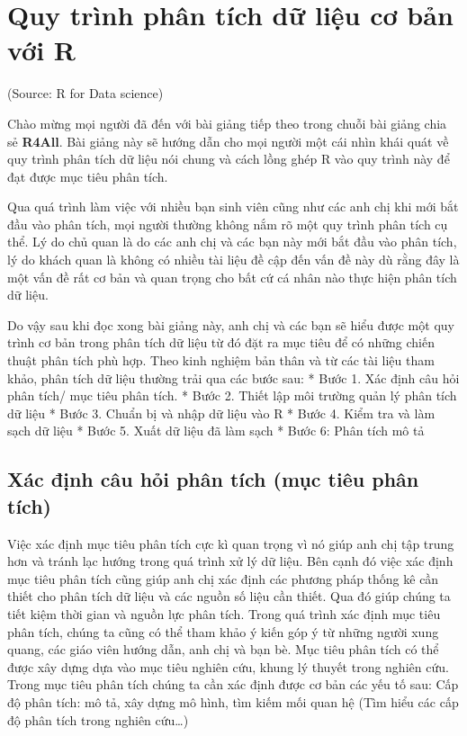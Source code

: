 \documentclass[
]{book}
\theoremstyle{definition}
\theoremstyle{definition}
\theoremstyle{definition}
\theoremstyle{definition}
\theoremstyle{remark}
\begin{document}
\hypertarget{quy-truxecnh-phuxe2n-tuxedch-dux1eef-liux1ec7u-cux1a1-bux1ea3n-vux1edbi-r}{%
\chapter{Quy trình phân tích dữ liệu cơ bản với R}\label{quy-truxecnh-phuxe2n-tuxedch-dux1eef-liux1ec7u-cux1a1-bux1ea3n-vux1edbi-r}}

(Source: R for Data science)

Chào mừng mọi người đã đến với bài giảng tiếp theo trong chuỗi bài giảng chia sẻ \textbf{R4All}. Bài giảng này sẽ hướng dẫn cho mọi người một cái nhìn khái quát về quy trình phân tích dữ liệu nói chung và cách lồng ghép R vào quy trình này để đạt được mục tiêu phân tích.

Qua quá trình làm việc với nhiều bạn sinh viên cũng như các anh chị khi mới bắt đầu vào phân tích, mọi người thường không nắm rõ một quy trình phân tích cụ thể. Lý do chủ quan là do các anh chị và các bạn này mới bắt đầu vào phân tích, lý do khách quan là không có nhiều tài liệu đề cập đến vấn đề này dù rằng đây là một vấn đề rất cơ bản và quan trọng cho bất cứ cá nhân nào thực hiện phân tích dữ liệu.

Do vậy sau khi đọc xong bài giảng này, anh chị và các bạn sẽ hiểu được một quy trình cơ bản trong phân tích dữ liệu từ đó đặt ra mục tiêu để có những chiến thuật phân tích phù hợp. Theo kinh nghiệm bản thân và từ các tài liệu tham khảo, phân tích dữ liệu thường trải qua các bước sau: * Bước 1. Xác định câu hỏi phân tích/ mục tiêu phân tích. * Bước 2. Thiết lập môi trường quản lý phân tích dữ liệu * Bước 3. Chuẩn bị và nhập dữ liệu vào R * Bước 4. Kiểm tra và làm sạch dữ liệu * Bước 5. Xuất dữ liệu đã làm sạch * Bước 6: Phân tích mô tả

\hypertarget{xuxe1c-ux111ux1ecbnh-cuxe2u-hux1ecfi-phuxe2n-tuxedch-mux1ee5c-tiuxeau-phuxe2n-tuxedch}{%
\section{Xác định câu hỏi phân tích (mục tiêu phân tích)}\label{xuxe1c-ux111ux1ecbnh-cuxe2u-hux1ecfi-phuxe2n-tuxedch-mux1ee5c-tiuxeau-phuxe2n-tuxedch}}

Việc xác định mục tiêu phân tích cực kì quan trọng vì nó giúp anh chị tập trung hơn và tránh lạc hướng trong quá trình xử lý dữ liệu. Bên cạnh đó việc xác định mục tiêu phân tích cũng giúp anh chị xác định các phương pháp thống kê cần thiết cho phân tích dữ liệu và các nguồn số liệu cần thiết. Qua đó giúp chúng ta tiết kiệm thời gian và nguồn lực phân tích. Trong quá trình xác định mục tiêu phân tích, chúng ta cũng có thể tham khảo ý kiến góp ý từ những người xung quang, các giáo viên hướng dẫn, anh chị và bạn bè. Mục tiêu phân tích có thể được xây dựng dựa vào mục tiêu nghiên cứu, khung lý thuyết trong nghiên cứu. Trong mục tiêu phân tích chúng ta cần xác định được cơ bản các yếu tố sau: Cấp độ phân tích: mô tả, xây dựng mô hình, tìm kiếm mối quan hệ (Tìm hiểu các cấp độ phân tích trong nghiên cứu\ldots)
\end{document}
